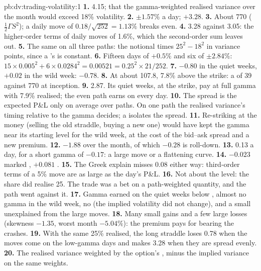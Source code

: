 \begin{solution}{pb:dv:trading-volatility:1}
\textbf{1.} 4.15; that the gamma-weighted realised variance over the month would exceed 18\% volatility.
\textbf{2.} $\pm1.57\%$ a day; $+3.28$.
\textbf{3.} About 770 ($\frac12\Gamma S^2$); a daily move of $0.18/\sqrt{252}=1.13\%$ breaks even.
\textbf{4.} 3.28 against 3.05: the higher-order terms of daily moves of 1.6\%, which the second-order sum leaves out.
\textbf{5.} The same on all three paths: the notional times $25^2-18^2$ in variance points, since a 's  is constant.
\textbf{6.} Fifteen days of $+0.5\%$ and six of $\pm2.84\%$: $15\times0.005^2+6\times0.0284^2=0.00521=0.25^2\times21/252$.
\textbf{7.} $-0.80$ in the quiet weeks, $+0.02$ in the wild week: $-0.78$.
\textbf{8.} At about 107.8, 7.8\% above the strike: a  of 39 against 770 at inception.
\textbf{9.} 2.87. Its quiet weeks, at the strike, pay  at full gamma with 7.9\% realised; the even path earns on every day.
\textbf{10.} The spread is the expected P\&L only on average over paths. On one path the realised variance's timing relative to the gamma decides; a 
isolates the spread.
\textbf{11.} Re-striking at the money (selling the old straddle, buying a new one) would have kept the gamma near its starting level for the wild week, at the cost of
the bid--ask spread and a new premium.
\textbf{12.} $-1.88$ over the month, of which $-0.28$ is roll-down.
\textbf{13.} 0.13 a day, for a short gamma of $-0.17$: a large move or a flattening curve.
\textbf{14.} $-0.023$ marked , $+0.081$ .
\textbf{15.} The Greek explain misses 0.08 either way: third-order terms of a 5\% move are as large as the day's P\&L.
\textbf{16.} Not about the level: the share did realise 25. The trade was a bet on a path-weighted quantity, and the path went against it.
\textbf{17.} Gamma earned on the quiet weeks below , almost no gamma in the wild week, no  (the implied volatility did not change), and a small unexplained
from the large moves.
\textbf{18.} Many small gains and a few large losses (skewness $-1.35$, worst month $-5.04\%$): the premium pays for bearing the crashes.
\textbf{19.} With the same 25\% realised, the long straddle loses 0.78 when the moves come on the low-gamma days and makes 3.28 when they are spread evenly.
\textbf{20.} The realised variance weighted by the option's , minus the implied variance on the same weights.
\end{solution}

